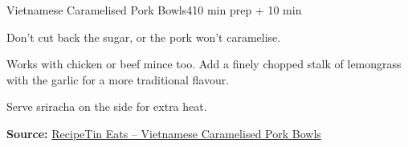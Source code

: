 \begin{recipebox}{Vietnamese Caramelised Pork Bowls}{4}{10 min prep + 10 min}
\begin{notelist}
  \item Don't cut back the sugar, or the pork won't caramelise.
  \item Works with chicken or beef mince too. Add a finely chopped stalk of
        lemongrass with the garlic for a more traditional flavour.
  \item Serve sriracha on the side for extra heat.
\end{notelist}

\noindent\textbf{Source:} \href{https://www.recipetineats.com/vietnamese-caramelised-pork-bowls/}{RecipeTin Eats -- Vietnamese Caramelised Pork Bowls}

\end{recipebox}
